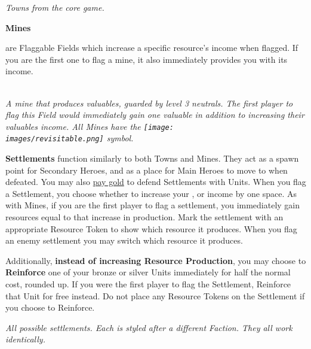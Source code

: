 \begin{multicols*}{2}
\begin{center}
  \textit{Towns from the core game.}
\end{center}

\medskip

\hypertarget{Mines}{\textbf{Mines}} are Flaggable Fields which increase a specific resource's income when flagged.
If you are the first one to flag a mine, it also immediately provides you with its income.

\begin{center}
  \\
  \textit{A mine that produces valuables, guarded by level 3 neutrals.
    The first player to flag this Field would immediately gain one valuable in addition to increasing their valuables income.
    All Mines have the \texttt{[image: \\images/revisitable.png]} symbol.
  }
\end{center}

\textbf{Settlements} function similarly to both Towns and Mines.
They act as a spawn point for Secondary Heroes, and as a place for Main Heroes to move to when defeated.
You may also \hyperlink{Town}{pay gold} to defend Settlements with Units.
When you flag a Settlement, you choose whether to increase your ,  or  income by one space.
As with Mines, if you are the first player to flag a settlement, you immediately gain resources equal to that increase in production.
Mark the settlement with an appropriate Resource Token to show which resource it produces.
When you flag an enemy settlement you may switch which resource it produces.\par
Additionally, \textbf{instead of increasing Resource Production}, you may choose to \textbf{Reinforce} one of your bronze or silver Units immediately for half the normal cost, rounded up.
If you were the first player to flag the Settlement, Reinforce that Unit for free instead.
Do not place any Resource Tokens on the Settlement if you choose to Reinforce.

\bigbreak

\begin{minipage}[h]{\linewidth}
  \centering
  \par
  \textit{All possible settlements.
  Each is styled after a different Faction.
  They all work identically.}
\end{minipage}
\end{multicols*}
\bigbreak

